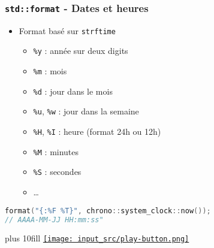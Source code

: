 \documentclass[C++.tex]{subfiles}
\begin{document}
\begin{frame}[fragile]
	\frametitle{\lstinline|std::format| - Dates et heures}
	\begin{itemize}
		\item Format basé sur \lstinline|strftime|
		\begin{itemize}
			\item \lstinline|%y| : année sur deux digits
			\item \lstinline|%m| : mois
			\item \lstinline|%d| : jour dans le mois
			\item \lstinline|%u|, \lstinline|%w| : jour dans la semaine


			\item \lstinline|%H|, \lstinline|%I| : heure (format 24h ou 12h)
			\item \lstinline|%M| : minutes
			\item \lstinline|%S| : secondes
			\item \ldots{}
		\end{itemize}
	\end{itemize}

	\begin{lstlisting}[language=C++]
format("{:%F %T}", chrono::system_clock::now());
// AAAA-MM-JJ HH:mm:ss"\end{lstlisting}

	\vskip 10mm plus 10fill
	\hfill
	\href{https://godbolt.org/#g:!((g:!((g:!((h:codeEditor,i:(filename:'1',fontScale:14,fontUsePx:'0',j:1,lang:c%2B%2B,selection:(endColumn:1,endLineNumber:9,positionColumn:1,positionLineNumber:9,selectionStartColumn:1,selectionStartLineNumber:1,startColumn:1,startLineNumber:1),source:'%23include+%3Ciostream%3E%0A%23include+%3Cchrono%3E%0A%23include+%3Cformat%3E%0A%0Aint+main()%0A%7B%0A++std::cout+%3C%3C+std::format(%22%7B:%25F+%25T%7D%22,+std::chrono::system_clock::now())%3B%0A%7D%0A'),l:'5',n:'0',o:'C%2B%2B+source+%231',t:'0')),k:50,l:'4',n:'0',o:'',s:0,t:'0'),(g:!((h:executor,i:(argsPanelShown:'1',compilationPanelShown:'0',compiler:gsnapshot,compilerName:'',compilerOutShown:'0',execArgs:'',execStdin:'',fontScale:14,fontUsePx:'0',j:1,lang:c%2B%2B,libs:!((name:boost,ver:'175')),options:'-std%3Dc%2B%2B20+-Wall+-Wextra+-pedantic',source:1,stdinPanelShown:'1',tree:'1',wrap:'0'),l:'5',n:'0',o:'Executor+x86-64+gcc+(trunk)+(C%2B%2B,+Editor+%231)',t:'0')),header:(),k:50,l:'4',n:'0',o:'',s:0,t:'0')),l:'2',n:'0',o:'',t:'0')),version:4}{\texttt{[image: input\_src/play-button.png]}}
\end{frame}
\end{document}
